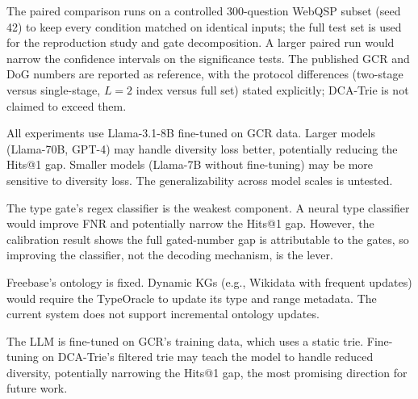 The paired comparison runs on a controlled 300-question WebQSP subset (seed 42) to keep
every condition matched on identical inputs; the full test set is used for the
reproduction study and gate decomposition. A larger paired run would narrow the
confidence intervals on the significance tests. The published GCR and DoG numbers are
reported as reference, with the protocol differences (two-stage versus single-stage,
$L{=}2$ index versus full set) stated explicitly; DCA-Trie is not claimed to exceed
them.

All experiments use Llama-3.1-8B fine-tuned on GCR data. Larger models (Llama-70B,
GPT-4) may handle diversity loss better, potentially reducing the Hits@1 gap. Smaller
models (Llama-7B without fine-tuning) may be more sensitive to diversity loss. The
generalizability across model scales is untested.

The type gate's regex classifier is the weakest component. A neural type classifier
would improve FNR and potentially narrow the Hits@1 gap. However, the calibration
result shows the full gated-number gap is attributable to the gates, so improving the
classifier, not the decoding mechanism, is the lever.

Freebase's ontology is fixed. Dynamic KGs (e.g., Wikidata with frequent updates) would
require the TypeOracle to update its type and range metadata. The current system does not
support incremental ontology updates.

The LLM is fine-tuned on GCR's training data, which uses a static trie. Fine-tuning on
DCA-Trie's filtered trie may teach the model to handle reduced diversity, potentially
narrowing the Hits@1 gap, the most promising direction for future work.

